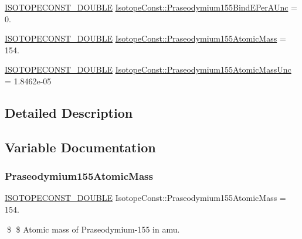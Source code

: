 \begin{DoxyCompactItemize}
\item 
\mbox{\hyperlink{group___isotope_const-_macros_ga8f45a7272ce02c0b4c65c44636ed719a}{I\+S\+O\+T\+O\+P\+E\+C\+O\+N\+S\+T\+\_\+\+D\+O\+U\+B\+LE}} \mbox{\hyperlink{group___isotope_const-_praseodymium-_pr155_ga792f5da38d32170bae134ca786190a64}{Isotope\+Const\+::\+Praseodymium155\+Bind\+E\+Per\+A\+Unc}} = 0.
\item 
\mbox{\hyperlink{group___isotope_const-_macros_ga8f45a7272ce02c0b4c65c44636ed719a}{I\+S\+O\+T\+O\+P\+E\+C\+O\+N\+S\+T\+\_\+\+D\+O\+U\+B\+LE}} \mbox{\hyperlink{group___isotope_const-_praseodymium-_pr155_ga92604b86da30ee786afce5102e2857f5}{Isotope\+Const\+::\+Praseodymium155\+Atomic\+Mass}} = 154.
\item 
\mbox{\hyperlink{group___isotope_const-_macros_ga8f45a7272ce02c0b4c65c44636ed719a}{I\+S\+O\+T\+O\+P\+E\+C\+O\+N\+S\+T\+\_\+\+D\+O\+U\+B\+LE}} \mbox{\hyperlink{group___isotope_const-_praseodymium-_pr155_gaed380bb7f0760110853a92017db2a66a}{Isotope\+Const\+::\+Praseodymium155\+Atomic\+Mass\+Unc}} = 1.\+8462e-\/05
\end{DoxyCompactItemize}


\subsection{Detailed Description}


\subsection{Variable Documentation}
\mbox{\label{group___isotope_const-_praseodymium-_pr155_ga92604b86da30ee786afce5102e2857f5}} 
\subsubsection{\texorpdfstring{Praseodymium155\+Atomic\+Mass}{Praseodymium155AtomicMass}}
{\footnotesize\ttfamily \mbox{\hyperlink{group___isotope_const-_macros_ga8f45a7272ce02c0b4c65c44636ed719a}{I\+S\+O\+T\+O\+P\+E\+C\+O\+N\+S\+T\+\_\+\+D\+O\+U\+B\+LE}} Isotope\+Const\+::\+Praseodymium155\+Atomic\+Mass = 154.}

\$ \$ Atomic mass of Praseodymium-\/155 in amu. \mbox{\label{group___isotope_const-_praseodymium-_pr155_gaed380bb7f0760110853a92017db2a66a}} 
